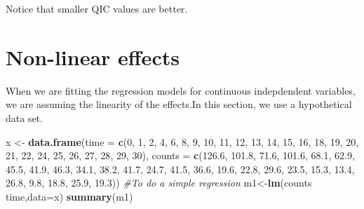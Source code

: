 \documentclass[]{book}
\newenvironment{Shaded}{\begin{snugshade}}{\end{snugshade}}
\newcommand{\KeywordTok}[1]{\textcolor[rgb]{0.13,0.29,0.53}{\textbf{#1}}}
\newcommand{\DataTypeTok}[1]{\textcolor[rgb]{0.13,0.29,0.53}{#1}}
\newcommand{\DecValTok}[1]{\textcolor[rgb]{0.00,0.00,0.81}{#1}}
\newcommand{\FloatTok}[1]{\textcolor[rgb]{0.00,0.00,0.81}{#1}}
\newcommand{\StringTok}[1]{\textcolor[rgb]{0.31,0.60,0.02}{#1}}
\newcommand{\CommentTok}[1]{\textcolor[rgb]{0.56,0.35,0.01}{\textit{#1}}}
\newcommand{\OperatorTok}[1]{\textcolor[rgb]{0.81,0.36,0.00}{\textbf{#1}}}
\newcommand{\NormalTok}[1]{#1}
\theoremstyle{definition}
\theoremstyle{definition}
\theoremstyle{definition}
\theoremstyle{remark}
\begin{document}
Notice that smaller QIC values are better.

\section{Non-linear effects}\label{non-linear-effects}

When we are fitting the regression models for continuous indepdendent
variables, we are assuming the linearity of the effects.In this section,
we use a hypothetical data set.

\begin{Shaded}
\begin{Highlighting}[]
\NormalTok{x <-}\StringTok{ }\KeywordTok{data.frame}\NormalTok{(}\DataTypeTok{time =} \KeywordTok{c}\NormalTok{(}\DecValTok{0}\NormalTok{, }\DecValTok{1}\NormalTok{, }\DecValTok{2}\NormalTok{, }\DecValTok{4}\NormalTok{, }\DecValTok{6}\NormalTok{, }\DecValTok{8}\NormalTok{, }\DecValTok{9}\NormalTok{, }\DecValTok{10}\NormalTok{, }\DecValTok{11}\NormalTok{, }\DecValTok{12}\NormalTok{, }\DecValTok{13}\NormalTok{, }
\DecValTok{14}\NormalTok{, }\DecValTok{15}\NormalTok{, }\DecValTok{16}\NormalTok{, }\DecValTok{18}\NormalTok{, }\DecValTok{19}\NormalTok{, }\DecValTok{20}\NormalTok{, }\DecValTok{21}\NormalTok{, }\DecValTok{22}\NormalTok{, }\DecValTok{24}\NormalTok{, }\DecValTok{25}\NormalTok{, }\DecValTok{26}\NormalTok{, }\DecValTok{27}\NormalTok{, }\DecValTok{28}\NormalTok{, }\DecValTok{29}\NormalTok{, }\DecValTok{30}\NormalTok{), }
\DataTypeTok{counts =} \KeywordTok{c}\NormalTok{(}\FloatTok{126.6}\NormalTok{, }\FloatTok{101.8}\NormalTok{, }\FloatTok{71.6}\NormalTok{, }\FloatTok{101.6}\NormalTok{, }\FloatTok{68.1}\NormalTok{, }\FloatTok{62.9}\NormalTok{, }\FloatTok{45.5}\NormalTok{, }\FloatTok{41.9}\NormalTok{, }
\FloatTok{46.3}\NormalTok{, }\FloatTok{34.1}\NormalTok{, }\FloatTok{38.2}\NormalTok{, }\FloatTok{41.7}\NormalTok{, }\FloatTok{24.7}\NormalTok{, }\FloatTok{41.5}\NormalTok{, }\FloatTok{36.6}\NormalTok{, }\FloatTok{19.6}\NormalTok{, }
\FloatTok{22.8}\NormalTok{, }\FloatTok{29.6}\NormalTok{, }\FloatTok{23.5}\NormalTok{, }\FloatTok{15.3}\NormalTok{, }\FloatTok{13.4}\NormalTok{, }\FloatTok{26.8}\NormalTok{, }\FloatTok{9.8}\NormalTok{, }\FloatTok{18.8}\NormalTok{, }\FloatTok{25.9}\NormalTok{, }\FloatTok{19.3}\NormalTok{))}
\CommentTok{#To do a simple regression}
\NormalTok{m1<-}\KeywordTok{lm}\NormalTok{(counts }\OperatorTok{~}\StringTok{ }\NormalTok{time,}\DataTypeTok{data=}\NormalTok{x)}
\KeywordTok{summary}\NormalTok{(m1)}
\end{Highlighting}
\end{Shaded}
\end{document}
